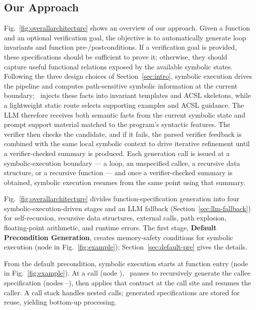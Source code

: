 \subsection{Our Approach} 




Fig.~\ref{fig:overallarchitecture} shows an overview of our approach. Given a function and an optional verification goal, the objective is to automatically generate loop invariants and function pre-/postconditions. If a verification goal is provided, these specifications should be sufficient to prove it; otherwise, they should capture useful functional relations exposed by the available symbolic states.
Following the three design choices of Section~\ref{sec:intro}, symbolic execution drives the pipeline and computes path-sensitive symbolic information at the current boundary; \toolname\ injects these facts into invariant templates and ACSL skeletons, while a lightweight static route selects supporting examples and ACSL guidance. The LLM therefore receives both semantic facts from the current symbolic state and prompt support material matched to the program's syntactic features. The verifier then checks the candidate, and if it fails, the parsed verifier feedback is combined with the same local symbolic context to drive iterative refinement until a verifier-checked summary is produced. Each generation call is issued at a symbolic-execution boundary --- a loop, an unspecified callee, a recursive data structure, or a recursive function --- and once a verifier-checked summary is obtained, symbolic execution resumes from the same point using that summary.

 

 
Fig.~\ref{fig:overallarchitecture} divides function-specification generation into four symbolic-execution-driven stages and an LLM fallback (Section~\ref{sec:llm-fallback}) for self-recursion, recursive data structures, external calls, path explosion, floating-point arithmetic, and runtime errors. The first stage, \textbf{Default Precondition Generation}, creates memory-safety conditions for symbolic execution (node  in Fig.~\ref{fig:example}); Section~\ref{sec:default-pre} gives the details.
 

From the default precondition, symbolic execution starts at function entry (node  in Fig.~\ref{fig:example}). At a call (node ), \toolname\ pauses to recursively generate the callee specification (nodes --), then applies that contract at the call site and resumes the caller. A call stack handles nested calls; generated specifications are stored for reuse, yielding bottom-up processing.



